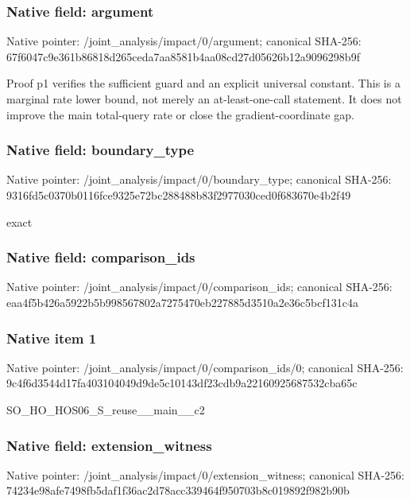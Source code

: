 \documentclass[10pt,a4paper]{article}
\begin{document}
\subsubsection{Native field: argument}
Native pointer: /joint\_\allowbreak{}analysis/impact/0/argument; canonical SHA-256: 67f6047c9e361b86818d265ceda7aa8581b4aa08cd27d05626b12a9096298b9f

\begingroup\raggedright\sloppy Proof p1 verifies the sufficient guard and an explicit universal constant. This is a marginal rate lower bound,\allowbreak{} not merely an at-least-one-call statement. It does not improve the main total-query rate or close the gradient-coordinate gap.\par\endgroup

\subsubsection{Native field: boundary\_\allowbreak{}type}
Native pointer: /joint\_\allowbreak{}analysis/impact/0/boundary\_\allowbreak{}type; canonical SHA-256: 9316fd5c0370b0116fce9325e72bc288488b83f2977030ced0f683670e4b2f49

\begingroup\raggedright\sloppy exact\par\endgroup

\subsubsection{Native field: comparison\_\allowbreak{}ids}
Native pointer: /joint\_\allowbreak{}analysis/impact/0/comparison\_\allowbreak{}ids; canonical SHA-256: eaa4f5b426a5922b5b998567802a7275470eb227885d3510a2e36c5bcf131c4a

\subsubsection{Native item 1}
Native pointer: /joint\_\allowbreak{}analysis/impact/0/comparison\_\allowbreak{}ids/0; canonical SHA-256: 9c4f6d3544d17fa403104049d9de5c10143df23cdb9a22160925687532cba65c

\begingroup\raggedright\sloppy SO\_\allowbreak{}HO\_\allowbreak{}HOS06\_\allowbreak{}S\_\allowbreak{}reuse\_\allowbreak{}\_\allowbreak{}main\_\allowbreak{}\_\allowbreak{}c2\par\endgroup

\subsubsection{Native field: extension\_\allowbreak{}witness}
Native pointer: /joint\_\allowbreak{}analysis/impact/0/extension\_\allowbreak{}witness; canonical SHA-256: 74234e98afe7498fb5daf1f36ac2d78acc339464f950703b8c019892f982b90b
\end{document}
